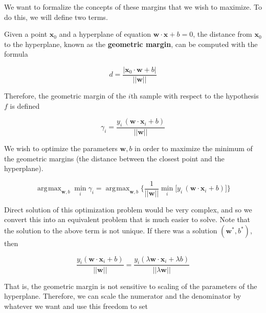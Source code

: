 \documentclass{article}
\DeclareMathOperator*{\argmax}{\arg\!\max}
\begin{document}
    We want to formalize the concepts of these margins that we wish to maximize. To do this, we will define two terms. 

    \begin{definition}
      Given a point $\mathbf{x}_0$ and a hyperplane of equation $\mathbf{w} \cdot \mathbf{x} + b = 0$, the distance from $\mathbf{x}_0$ to the hyperplane, known as the \textbf{geometric margin}, can be computed with the formula 

      \begin{equation}
        d = \frac{|\mathbf{x}_0 \cdot \mathbf{w} + b|}{||\mathbf{w}||}  
      \end{equation} 

      Therefore, the geometric margin of the $i$th sample with respect to the hypothesis $f$ is defined 

      \begin{equation}
        \gamma_i = \frac{y_i \, (\mathbf{w} \cdot \mathbf{x}_i + b)}{||\mathbf{w}||} 
      \end{equation} 
    \end{definition}

    We wish to optimize the parameters $\mathbf{w}, b$ in order to maximize the minimum of the geometric margins (the distance between the closest point and the hyperplane). 

    \begin{equation}
      \argmax_{\mathbf{w}, b} \min_i \gamma_i = \argmax_{\mathbf{w}, b} \bigg\{ \frac{1}{||\mathbf{w}||} \min_i \big[y_i \, (\mathbf{w} \cdot \mathbf{x}_i + b) \big] \bigg\}
    \end{equation}

    Direct solution of this optimization problem would be very complex, and so we convert this into an equivalent problem that is much easier to solve. Note that the solution to the above term is not unique. If there was a solution $(\mathbf{w}^\ast, b^\ast)$, then 

    \begin{equation}
      \frac{y_i (\mathbf{w} \cdot \mathbf{x}_i + b)}{||\mathbf{w}||} = \frac{y_i (\lambda \mathbf{w} \cdot \mathbf{x}_i + \lambda b)}{||\lambda \mathbf{w}||}  
    \end{equation}

    That is, the geometric margin is not sensitive to scaling of the parameters of the hyperplane. Therefore, we can scale the numerator and the denominator by whatever we want and use this freedom to set 
\end{document}
